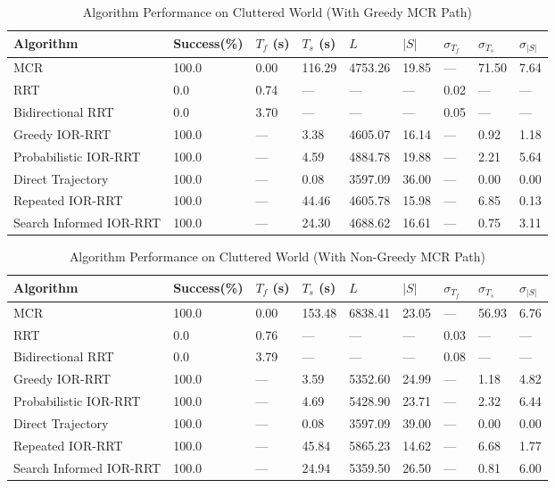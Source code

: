 \begin{table}[h!]
\centering
\begin{tabular}{@{}lllllllll@{}}
\toprule
Algorithm & Success(\%) & $T_f$ (s) & $T_s$ (s) & $L$ & $|S|$ & $\sigma_{T_f}$ & $\sigma_{T_s}$ & $\sigma_{|S|}$ \\
\midrule
MCR & 100.0 & 0.00 & 116.29 & 4753.26 & 19.85 & --- & 71.50 & 7.64 \\
RRT & 0.0 & 0.74 & --- & --- & --- & 0.02 & --- & --- \\
Bidirectional RRT & 0.0 & 3.70 & --- & --- & --- & 0.05 & --- & --- \\
Greedy IOR-RRT & 100.0 & --- & 3.38 & 4605.07 & 16.14 & --- & 0.92 & 1.18 \\
Probabilistic IOR-RRT & 100.0 & --- & 4.59 & 4884.78 & 19.88 & --- & 2.21 & 5.64 \\
Direct Trajectory & 100.0 & --- & 0.08 & 3597.09 & 36.00 & --- & 0.00 & 0.00 \\
Repeated IOR-RRT & 100.0 & --- & 44.46 & 4605.78 & 15.98 & --- & 6.85 & 0.13 \\
Search Informed IOR-RRT & 100.0 & --- & 24.30 & 4688.62 & 16.61 & --- & 0.75 & 3.11 \\
\bottomrule
\end{tabular}
\caption{Algorithm Performance on Cluttered World (With Greedy MCR Path)}
\label{tab:cluttered_world}
\end{table}

\begin{table}[h!]
\centering
\begin{tabular}{@{}lllllllll@{}}
\toprule
Algorithm & Success(\%) & $T_f$ (s) & $T_s$ (s) & $L$ & $|S|$ & $\sigma_{T_f}$ & $\sigma_{T_s}$ & $\sigma_{|S|}$ \\
\midrule
MCR & 100.0 & 0.00 & 153.48 & 6838.41 & 23.05 & --- & 56.93 & 6.76\\
RRT & 0.0 & 0.76 & --- & --- & --- & 0.03 & --- & --- \\
Bidirectional RRT & 0.0 & 3.79 & --- & --- & --- & 0.08 & --- & --- \\
Greedy IOR-RRT & 100.0 & --- & 3.59 & 5352.60 & 24.99 & --- & 1.18 & 4.82 \\
Probabilistic IOR-RRT & 100.0 & --- & 4.69 & 5428.90 & 23.71 & --- & 2.32 & 6.44 \\
Direct Trajectory & 100.0 & --- & 0.08 & 3597.09 & 39.00 & --- & 0.00 & 0.00 \\
Repeated IOR-RRT & 100.0 & --- & 45.84 & 5865.23 & 14.62 & --- & 6.68 & 1.77 \\
Search Informed IOR-RRT & 100.0 & --- & 24.94 & 5359.50 & 26.50 & --- & 0.81 & 6.00 \\
\bottomrule
\end{tabular}
\caption{Algorithm Performance on Cluttered World (With Non-Greedy MCR Path)}
\label{tab:top_light_cluttered_world}
\end{table}

\clearpage
\newpage
